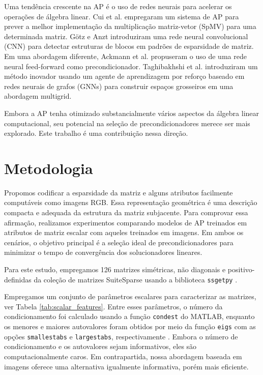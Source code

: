 \documentclass{pssbmac}
\begin{document}
Uma tendência crescente na AP é o uso de redes neurais para acelerar os 
operações de álgebra linear. Cui et al. \cite{cui2016code} empregaram um sistema de 
AP para prever a melhor implementação da multiplicação matriz-vetor (SpMV) para uma 
determinada matriz. G{\"o}tz e Anzt \cite{gotz2018machine} introduziram 
uma rede neural convolucional (CNN) para detectar estruturas de blocos em 
padrões de esparsidade de matriz. Em uma abordagem diferente, 
Ackmann et al. \cite{ackmann2020machine} propuseram o uso de uma 
rede neural feed-forward como precondicionador. Taghibakhshi et al. 
\cite{taghibakhshi2021optimization} introduziram um método inovador usando 
um agente de aprendizagem por reforço baseado em redes neurais de grafos (GNNs) 
para construir espaços grosseiros em uma abordagem multigrid. 

Embora a AP tenha otimizado substancialmente vários aspectos da álgebra linear computacional,
seu potencial na seleção de precondicionadores merece ser mais explorado. 
Este trabalho é uma contribuição nessa direção.

\section{Metodologia}\label{sec:method}

Propomos codificar a esparsidade da matriz e alguns atributos facilmente 
computáveis como imagens RGB. Essa representação geométrica é uma descrição compacta 
e adequada da estrutura da matriz subjacente. Para comprovar essa afirmação, 
realizamos experimentos comparando modelos de AP treinados em atributos de 
matriz escalar com aqueles treinados em imagens. Em ambos os cenários, o 
objetivo principal é a seleção ideal de precondicionadores para minimizar o tempo de 
convergência dos solucionadores lineares.

Para este estudo, empregamos 126 matrizes simétricas, 
não diagonais e positivo-definidas da coleção de matrizes SuiteSparse usando a
biblioteca \texttt{ssgetpy} \cite{kolodziej2019suitesparse,ssgetpy}. 

Empregamos um conjunto de parâmetros escalares para caracterizar 
as matrizes, ver Tabela \ref{tab:scalar_features}.
Entre esses parâmetros, o número da condicionamento foi calculado usando a 
função \texttt{condest} do MATLAB, enquanto os menores e maiores autovalores 
foram obtidos por meio da função \texttt{eigs} com as opções \texttt{smallestabs} e 
\texttt{largestabs}, respectivamente \cite{matlab}. 
Embora o número de condicionamento e os autovalores sejam informativos, 
eles são computacionalmente caros. Em contrapartida, 
nossa abordagem baseada em imagens oferece uma alternativa igualmente informativa, 
porém mais eficiente.
\end{document}
